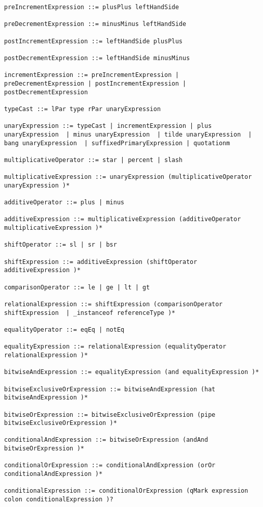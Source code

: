 \begin{lstlisting}[breaklines=true]
preIncrementExpression ::= plusPlus leftHandSide

preDecrementExpression ::= minusMinus leftHandSide

postIncrementExpression ::= leftHandSide plusPlus

postDecrementExpression ::= leftHandSide minusMinus

incrementExpression ::= preIncrementExpression | preDecrementExpression | postIncrementExpression | postDecrementExpression

typeCast ::= lPar type rPar unaryExpression

unaryExpression ::= typeCast | incrementExpression | plus unaryExpression  | minus unaryExpression  | tilde unaryExpression  | bang unaryExpression  | suffixedPrimaryExpression | quotationm

multiplicativeOperator ::= star | percent | slash

multiplicativeExpression ::= unaryExpression (multiplicativeOperator unaryExpression )*

additiveOperator ::= plus | minus

additiveExpression ::= multiplicativeExpression (additiveOperator multiplicativeExpression )*

shiftOperator ::= sl | sr | bsr

shiftExpression ::= additiveExpression (shiftOperator additiveExpression )*

comparisonOperator ::= le | ge | lt | gt

relationalExpression ::= shiftExpression (comparisonOperator shiftExpression  | _instanceof referenceType )*

equalityOperator ::= eqEq | notEq

equalityExpression ::= relationalExpression (equalityOperator relationalExpression )*

bitwiseAndExpression ::= equalityExpression (and equalityExpression )*

bitwiseExclusiveOrExpression ::= bitwiseAndExpression (hat bitwiseAndExpression )*

bitwiseOrExpression ::= bitwiseExclusiveOrExpression (pipe bitwiseExclusiveOrExpression )*

conditionalAndExpression ::= bitwiseOrExpression (andAnd bitwiseOrExpression )*

conditionalOrExpression ::= conditionalAndExpression (orOr conditionalAndExpression )*

conditionalExpression ::= conditionalOrExpression (qMark expression colon conditionalExpression )?


\end{lstlisting}
